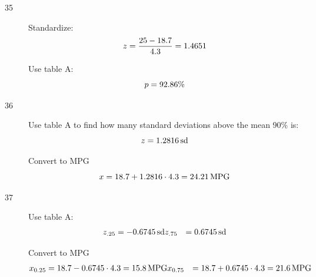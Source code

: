 \documentclass{exam}
\begin{document}
\begin{description}

      \item[35]
        Standardize:
        \[
          z = \frac{25 - 18.7}{4.3} = 1.4651 \\
        \]

        Use table A: 
        \[
          p = 92.86 \% \\
        \]

      \item[36]
        Use table A to find how many standard deviations above the mean 90\% is: 
        \[
          z = \unit[1.2816]{sd}
        \]

        Convert to MPG
        \[
          x = 18.7 + 1.2816 \cdot 4.3 = \unit[24.21]{MPG}
        \]

      \item[37]
        Use table A: 
        \begin{align*}
          z_{.25} &= \unit[-0.6745]{sd}
          z_{.75} &= \unit[0.6745]{sd}
        \end{align*}

        Convert to MPG
        \begin{align*}
          x_{0.25} &= 18.7 - 0.6745 \cdot 4.3 = \unit[15.8]{MPG}
          x_{0.75} &= 18.7 + 0.6745 \cdot 4.3 = \unit[21.6]{MPG}
        \end{align*}


\end{description}
\end{document}
